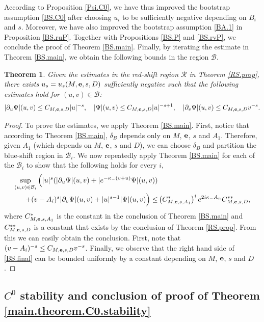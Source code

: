 \documentclass[10pt, reqno]{amsart}
\newtheorem{theorem}{Theorem}[section]
\theoremstyle{definition}
\theoremstyle{remark}
\numberwithin{equation}{section}
\newcommand{\rd}{\partial}
\newcommand{\bb}{\Big}
\newcommand{\0}{\emptyset}
\newcommand{\de}{\delta}
\begin{document}
According to Proposition \ref{Psi.C0}, we have thus improved the bootstrap assumption \eqref{BS.C0} after choosing $u_i$ to be sufficiently negative depending on $B_i$ and $s$. Moreover, we have also improved the bootstrap assumption \eqref{BA.1} in Proposition \ref{BS.ruP}. Together with Propositions \ref{BS.P} and \ref{BS.rvP}, we conclude the proof of Theorem \ref{BS.main}. Finally, by iterating the estimate in Theorem \ref{BS.main}, we obtain the following bounds in the region $\mathcal B$.
\begin{theorem}\label{BS.prop}
Given the estimates in the red-shift region $\mathcal R$ in Theorem \ref{RS.prop}, there exists $u_s=u_s(M,{\bf e},s,D)$ sufficiently negative such that the following estimates hold for $(u,v)\in\mathcal B$:
$$|\rd_u\Psi|(u,v)\leq C_{M,{\bf e},s,D}|u|^{-s},\quad |\Psi|(u,v)\leq C_{M,{\bf e},s,D}|u|^{-s+1},\quad |\rd_v\Psi|(u,v)\leq C_{M,{\bf e},s,D}v^{-s}.$$
\end{theorem}
\begin{proof}
To prove the estimates, we apply Theorem \ref{BS.main}. First, notice that according to Theorem \ref{BS.main}, $\de_B$ depends only on $M$, ${\bf e}$, $s$ and $A_1$. Therefore, given $A_1$ (which depends on $M$, ${\bf e}$, $s$ and $D$), we can choose $\de_B$ and partition the blue-shift region in $\mathcal B_i$. We now repeatedly apply Theorem \ref{BS.main} for each of the $\mathcal B_i$ to show that the following holds for every $i$, 
\begin{equation}\label{BS.final}
\begin{split}
\sup_{(u,v)\in\mathcal B_i} \bb( |u|^s(|\rd_u\Psi|(u,v)+|e^{-\kappa_- (v+u)}\Psi|(u,v)) &\\
+(v-A_i)^s|\rd_v\Psi|(u,v)+|u|^{s-1}|\Psi|(u,v) \bb)
\leq &\left(C_{M, {\bf e},s,A_1}^*\right)^i e^{2i\kappa_-A_n} C_{M,{\bf e},s,D}^{**},
\end{split}
\end{equation}
where $C_{M, {\bf e},s,A_1}^*$ is the constant in the conclusion of Theorem \ref{BS.main} and $C_{M,{\bf e},s,D}^{**}$ is a constant that exists by the conclusion of Theorem \ref{RS.prop}. From this we can easily obtain the conclusion. First, note that $(v-A_i)^{-s}\leq C_{M,{\bf e},s,D}v^{-s}$. Finally, we observe that the right hand side of \eqref{BS.final} can be bounded uniformly by a constant depending on $M$, ${\bf e}$, $s$ and $D$.
\end{proof}

\subsection{$C^0$ stability and conclusion of proof of Theorem \ref{main.theorem.C0.stability}}\label{sec.C0}
\end{document}
